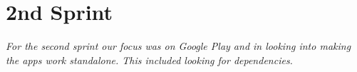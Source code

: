 \chapter{2nd Sprint} \label{ChapSprint2}
\textit{For the second sprint our focus was on Google Play and in looking into making the apps work standalone. This included looking for dependencies.}




%


